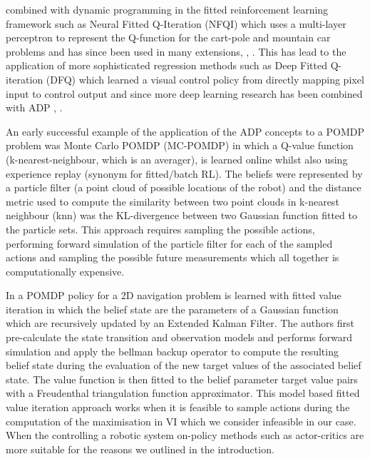 \documentclass[final,5p,times,twocolumn]{elsarticle}
\begin{document}
combined with dynamic programming in the fitted reinforcement learning framework such as 
Neural Fitted Q-Iteration (NFQI) \cite{Riedmiller2005} which uses a multi-layer perceptron to represent the Q-function for 
the cart-pole and mountain car problems and has since been used in many extensions, \cite{NAC_2008}, \cite{rl_gmm_2010}. 
This has lead to the application of more sophisticated regression methods such as Deep Fitted Q-iteration (DFQ) \cite{Lange_riedmiller_2010} which learned a visual 
control policy from directly mapping pixel input to control output and since more deep learning research has been combined with ADP \cite{mnih-dqn-2015}, \cite{DRQ_AAAI_2015}.

An early successful example of the application of the ADP concepts to a POMDP problem was Monte Carlo POMDP (MC-POMDP) \cite{Thrun_1999} in which a 
Q-value function (k-nearest-neighbour, which is an averager), is learned online whilst also using experience 
replay (synonym for fitted/batch RL). The beliefs were represented by a particle filter (a point cloud of possible locations of the robot) 
and the distance metric used to compute the similarity between two point clouds in k-nearest neighbour (knn) was the KL-divergence 
between two Gaussian function fitted to the particle sets. This approach requires sampling the possible actions, performing 
forward simulation of the particle filter for each of the sampled actions and sampling the possible future measurements which all 
together is computationally expensive. 

In \cite{PPOMDP_2006} a POMDP policy for a 2D navigation problem is learned with fitted value iteration in which 
the belief state are the parameters of a Gaussian function which are recursively updated by an Extended Kalman Filter. 
The authors first pre-calculate the state transition and observation models and performs forward simulation and apply the bellman 
backup operator to compute the resulting belief state during the evaluation of the new target values of the associated belief state. The value function is 
then fitted to the belief parameter target value pairs with a Freudenthal triangulation function approximator. 
This model based fitted value iteration approach works when it is feasible to sample actions during the computation 
of the maximisation in VI which we consider infeasible in our case. When the controlling a robotic system on-policy 
methods such as actor-critics are more suitable for the reasons we outlined in the introduction.
\end{document}
